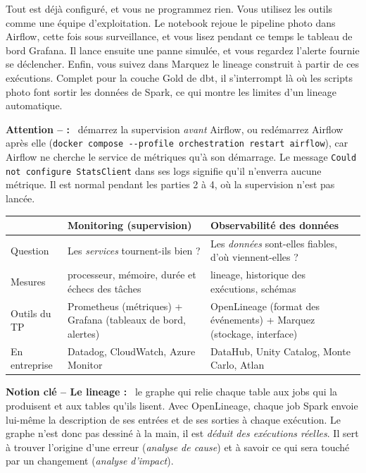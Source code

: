 \documentclass[11pt,a4paper]{article}
\newenvironment{attention}[1][]{\par\medskip\noindent\textbf{\textcolor{lhred}{Attention\if\relax\detokenize{#1}\relax\else{} -- #1\fi{} :}}\ }{\par\medskip}
\newcommand{\cmd}[1]{\texttt{#1}}
\newenvironment{notion}[1][]{\par\medskip\noindent\textbf{\textcolor{lhblue}{Notion clé\if\relax\detokenize{#1}\relax\else{} -- #1\fi{} :}}\ }{\par\medskip}
\begin{document}
Tout est déjà configuré, et vous ne programmez rien. Vous utilisez les outils comme une équipe
d'exploitation. Le notebook rejoue le pipeline photo dans Airflow, cette fois sous surveillance, et
vous lisez pendant ce temps le tableau de bord Grafana. Il lance ensuite une panne simulée, et vous
regardez l'alerte fournie se déclencher. Enfin, vous suivez dans Marquez le lineage construit à partir
de ces exécutions. Complet pour la couche Gold de dbt, il s'interrompt là où les scripts photo font sortir les données de
Spark, ce qui montre les limites d'un lineage automatique.

\begin{attention}
démarrez la supervision \emph{avant} Airflow, ou redémarrez Airflow après elle
(\cmd{docker compose -{}-profile orchestration restart airflow}), car Airflow ne cherche le service de
métriques qu'à son démarrage. Le message \cmd{Could not configure StatsClient} dans ses logs signifie
qu'il n'enverra aucune métrique. Il est normal pendant les parties 2 à 4, où la supervision n'est pas
lancée.
\end{attention}

\begin{center}
\small
\renewcommand{\arraystretch}{1.25}
\begin{tabularx}{\textwidth}{@{}l X X@{}}
\toprule
& \textbf{Monitoring (supervision)} & \textbf{Observabilité des données} \\
\midrule
Question & Les \emph{services} tournent-ils bien ? & Les \emph{données} sont-elles fiables, d'où viennent-elles ? \\
Mesures & processeur, mémoire, durée et échecs des tâches & lineage, historique des exécutions, schémas \\
Outils du TP & Prometheus (métriques) + Grafana (tableaux de bord, alertes) & OpenLineage (format des événements) + Marquez (stockage, interface) \\
En entreprise & Datadog, CloudWatch, Azure Monitor & DataHub, Unity Catalog, Monte Carlo, Atlan \\
\bottomrule
\end{tabularx}
\end{center}

\begin{notion}[Le lineage]
le graphe qui relie chaque table aux jobs qui la produisent et aux tables
qu'ils lisent. Avec OpenLineage, chaque job Spark envoie lui-même la description de ses entrées et de
ses sorties à chaque exécution. Le graphe n'est donc pas dessiné à la main, il est \emph{déduit des
exécutions réelles}. Il sert à trouver l'origine d'une erreur (\emph{analyse de cause}) et à savoir
ce qui sera touché par un changement (\emph{analyse d'impact}).
\end{notion}
\end{document}

